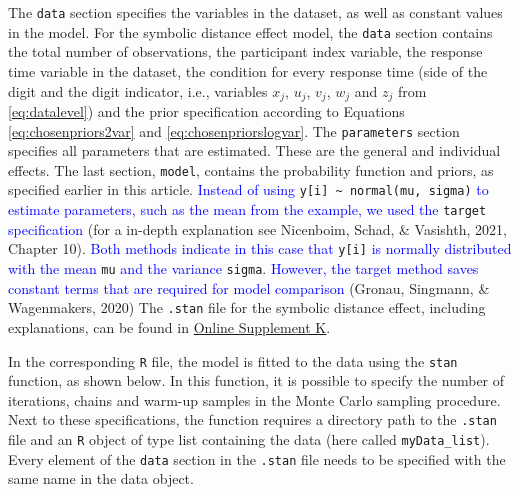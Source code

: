 \documentclass[
  english,
  doc,floatsintext]{apa6}
\begin{document}
The \texttt{data} section specifies the variables in the dataset, as well as constant values in the model. For the symbolic distance effect model, the \texttt{data} section contains the total number of observations, the participant index variable, the response time variable in the dataset, the condition for every response time (side of the digit and the digit indicator, i.e., variables \(x_j\), \(u_j\), \(v_j\), \(w_j\) and \(z_j\) from \eqref{eq:datalevel}) and the prior specification according to Equations \eqref{eq:chosenpriors2var} and \eqref{eq:chosenpriorslogvar}. The \texttt{parameters} section specifies all parameters that are estimated. These are the general and individual effects. The last section, \texttt{model}, contains the probability function and priors, as specified earlier in this article. \textcolor{blue}{Instead of using} \texttt{y{[}i{]}\ \textasciitilde{}\ normal(mu,\ sigma)} \textcolor{blue}{to estimate parameters, such as the mean from the example, we used the} \texttt{target} \textcolor{blue}{specification} (for a in-depth explanation see Nicenboim, Schad, \& Vasishth, 2021, Chapter 10). \textcolor{blue}{Both methods indicate in this case that} \texttt{y{[}i{]}} \textcolor{blue}{is normally distributed with the mean} \texttt{mu} \textcolor{blue}{and the variance} \texttt{sigma}. \textcolor{blue}{However, the target method saves constant terms that are required for model comparison} (Gronau, Singmann, \& Wagenmakers, 2020) The \texttt{.stan} file for the symbolic distance effect, including explanations, can be found in \href{https://github.com/MyrtheV/Bayesian-Hierarchical-Modelling-An-Introduction-and-Reassessment/blob/main/R\%20objects/rstan/normal\%20model/myModel.stan}{Online Supplement K}.

In the corresponding \texttt{R} file, the model is fitted to the data using the \texttt{stan} function, as shown below. In this function, it is possible to specify the number of iterations, chains and warm-up samples in the Monte Carlo sampling procedure. Next to these specifications, the function requires a directory path to the \texttt{.stan} file and an \texttt{R} object of type list containing the data (here called \texttt{myData\_list}). Every element of the \texttt{data} section in the \texttt{.stan} file needs to be specified with the same name in the data object.
~

\scriptsize
\end{document}
